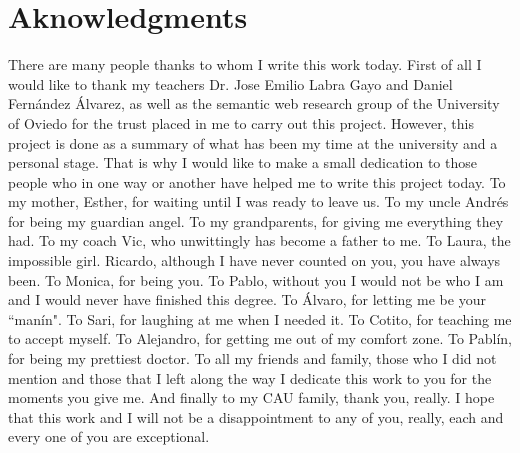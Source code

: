 \chapter*{Aknowledgments}

There are many people thanks to whom I write this work today. First of all I would like to thank my teachers Dr. Jose Emilio Labra Gayo and Daniel Fernández Álvarez, as well as the semantic web research group of the University of Oviedo for the trust placed in me to carry out this project.
However, this project is done as a summary of what has been my time at the university and a personal stage. That is why I would like to make a small dedication to those people who in one way or another have helped me to write this project today.
To my mother, Esther, for waiting until I was ready to leave us. To my uncle Andrés for being my guardian angel. To my grandparents, for giving me everything they had. To my coach Vic, who unwittingly has become a father to me. To Laura, the impossible girl. Ricardo, although I have never counted on you, you have always been. To Monica, for being you. To Pablo, without you I would not be who I am and I would never have finished this degree. To Álvaro, for letting me be your “manín". To Sari, for laughing at me when I needed it. To Cotito, for teaching me to accept myself. To Alejandro, for getting me out of my comfort zone. To Pablín, for being my prettiest doctor. To all my friends and family, those who I did not mention and those that I left along the way I dedicate this work to you for the moments you give me. And finally to my CAU family, thank you, really.
I hope that this work and I will not be a disappointment to any of you, really, each and every one of you are exceptional.

